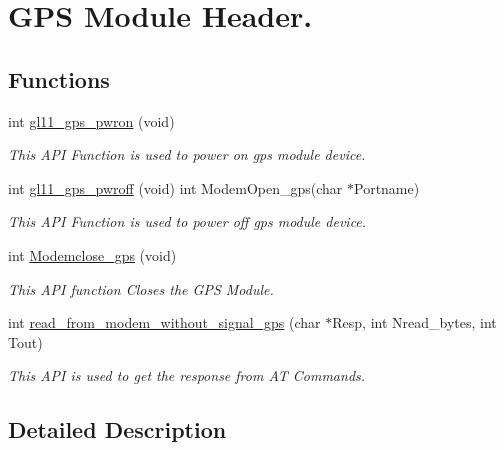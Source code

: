 \hypertarget{group__K}{\section{G\+P\+S Module Header.}
\label{group__K}
}
\subsection*{Functions}
\begin{DoxyCompactItemize}
\item 
int \hyperlink{group__K_ga2cd518698a40d53594100755e204d268}{gl11\+\_\+gps\+\_\+pwron} (void)
\begin{DoxyCompactList}\small\item\em This A\+P\+I Function is used to power on gps module device. \end{DoxyCompactList}\item 
int \hyperlink{group__K_gac57d232a38c04f4c9c8f38af5012779d}{gl11\+\_\+gps\+\_\+pwroff} (void) int Modem\+Open\+\_\+gps(char $\ast$Portname)
\begin{DoxyCompactList}\small\item\em This A\+P\+I Function is used to power off gps module device. \end{DoxyCompactList}\item 
int \hyperlink{group__K_ga7e7626d1301bbdaefea7ef3e99d2ed03}{Modemclose\+\_\+gps} (void)
\begin{DoxyCompactList}\small\item\em This A\+P\+I function Closes the G\+P\+S Module. \end{DoxyCompactList}\item 
int \hyperlink{group__K_ga42c01376d0e7537fdbb26449836aa15f}{read\+\_\+from\+\_\+modem\+\_\+without\+\_\+signal\+\_\+gps} (char $\ast$Resp, int Nread\+\_\+bytes, int Tout)
\begin{DoxyCompactList}\small\item\em This A\+P\+I is used to get the response from A\+T Commands. \end{DoxyCompactList}\end{DoxyCompactItemize}


\subsection{Detailed Description}


